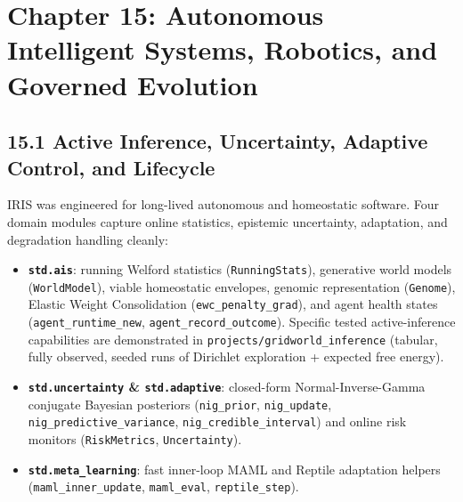 \documentclass[
  english,
  oneside]{book}
\providecommand{\tightlist}{%
  \setlength{\itemsep}{0pt}\setlength{\parskip}{0pt}}
\begin{document}
\chapter{Chapter 15: Autonomous Intelligent Systems, Robotics, and
Governed
Evolution}\label{chapter-15-autonomous-intelligent-systems-robotics-and-governed-evolution}

\section{15.1 Active Inference, Uncertainty, Adaptive Control, and
Lifecycle}\label{active-inference-uncertainty-adaptive-control-and-lifecycle}

IRIS was engineered for long-lived autonomous and homeostatic software.
Four domain modules capture online statistics, epistemic uncertainty,
adaptation, and degradation handling cleanly:

\begin{itemize}
\tightlist
\item
  \textbf{\texttt{std.ais}}: running Welford statistics
  (\texttt{RunningStats}), generative world models
  (\texttt{WorldModel}), viable homeostatic envelopes, genomic
  representation (\texttt{Genome}), Elastic Weight Consolidation
  (\texttt{ewc\_penalty\_grad}), and agent health states
  (\texttt{agent\_runtime\_new}, \texttt{agent\_record\_outcome}).
  Specific tested active-inference capabilities are demonstrated in
  \texttt{projects/gridworld\_inference} (tabular, fully observed,
  seeded runs of Dirichlet exploration + expected free energy).
\item
  \textbf{\texttt{std.uncertainty} \& \texttt{std.adaptive}}:
  closed-form Normal-Inverse-Gamma conjugate Bayesian posteriors
  (\texttt{nig\_prior}, \texttt{nig\_update},
  \texttt{nig\_predictive\_variance}, \texttt{nig\_credible\_interval})
  and online risk monitors (\texttt{RiskMetrics}, \texttt{Uncertainty}).
\item
  \textbf{\texttt{std.meta\_learning}}: fast inner-loop MAML and Reptile
  adaptation helpers (\texttt{maml\_inner\_update}, \texttt{maml\_eval},
  \texttt{reptile\_step}).
\end{itemize}
\end{document}

